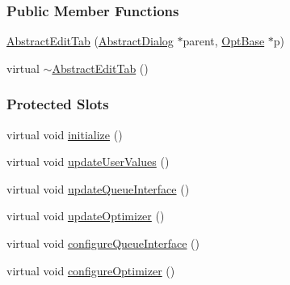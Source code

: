 \subsubsection*{Public Member Functions}
\begin{DoxyCompactItemize}
\item 
\hyperlink{classGlobalSearch_1_1AbstractEditTab_a7c6f355f4e1ee393bb2dd93425e6f02a}{Abstract\+Edit\+Tab} (\hyperlink{classGlobalSearch_1_1AbstractDialog}{Abstract\+Dialog} $\ast$parent, \hyperlink{classGlobalSearch_1_1OptBase}{Opt\+Base} $\ast$p)
\item 
virtual \hyperlink{classGlobalSearch_1_1AbstractEditTab_ab4d202689e2018ad8db8b23a485d091d}{$\sim$\+Abstract\+Edit\+Tab} ()
\end{DoxyCompactItemize}
\subsubsection*{Protected Slots}
\begin{DoxyCompactItemize}
\item 
virtual void \hyperlink{classGlobalSearch_1_1AbstractEditTab_afb9fd8fbcf71d7287a8117ce4d75a00b}{initialize} ()
\item 
virtual void \hyperlink{classGlobalSearch_1_1AbstractEditTab_a3c241c0807a7f1dff4e75a7d9f2354fc}{update\+User\+Values} ()
\item 
virtual void \hyperlink{classGlobalSearch_1_1AbstractEditTab_aec415636f7b9aa295f8ae6d9a9035184}{update\+Queue\+Interface} ()
\item 
virtual void \hyperlink{classGlobalSearch_1_1AbstractEditTab_ad92c42eafb4b2bf681f3032148083441}{update\+Optimizer} ()
\item 
virtual void \hyperlink{classGlobalSearch_1_1AbstractEditTab_a4bd14eb377b74813bfc1474b92432567}{configure\+Queue\+Interface} ()
\item 
virtual void \hyperlink{classGlobalSearch_1_1AbstractEditTab_a4cc539eb78a2bcb984e46f73cbe2dfcd}{configure\+Optimizer} ()
\end{DoxyCompactItemize}
